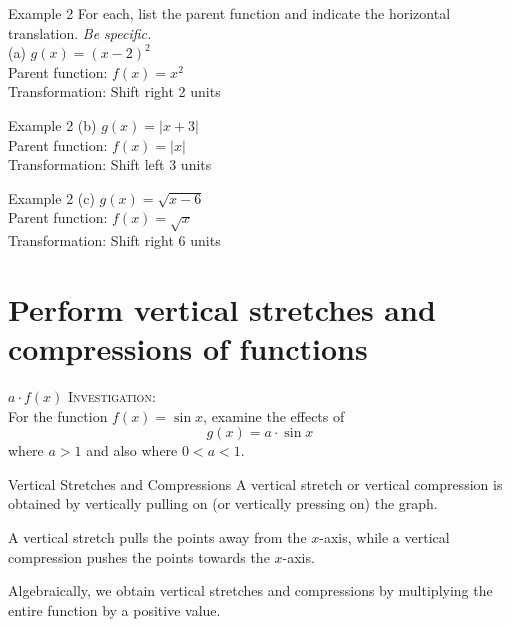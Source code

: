 \documentclass[t]{beamer}
\begin{document}
\begin{frame}{Example 2}
For each, list the parent function and indicate the horizontal translation. \emph{Be specific.}	\newline\\
(a) \quad $g(x) = (x-2)^2$	\newline\\	\pause
Parent function: $f(x) = x^2$ \newline\\	\pause
Transformation: Shift right 2 units
\end{frame}

\begin{frame}{Example 2}
(b) \quad $g(x) = |x+3|$	\newline\\	\pause
Parent function: $f(x) = |x|$ \newline\\	\pause
Transformation: Shift left 3 units
\end{frame}

\begin{frame}{Example 2}
(c) \quad $g(x) = \sqrt{x-6}$	\newline\\	\pause
Parent function: $f(x) = \sqrt{x}$ \newline\\	\pause
Transformation: Shift right 6 units
\end{frame}

\section{Perform vertical stretches and compressions of functions}

\begin{frame}{$a \cdot f(x)$}
\textsc{Investigation:}	\newline\\

For the function $f(x) = \sin x$, examine the effects of
\[g(x) = a \cdot \sin x \]
where $a > 1$ and also where $0 < a < 1$.
\end{frame}

\begin{frame}{Vertical Stretches and Compressions}
A \alert{vertical stretch} or \alert{vertical compression} is obtained by vertically pulling on (or vertically pressing on) the graph.	\newline\\	\pause

A vertical stretch pulls the points away from the $x$-axis, while a vertical compression pushes the points towards the $x$-axis. \newline\\ \pause

Algebraically, we obtain vertical stretches and compressions by multiplying the entire function by a positive value.
\end{frame}
\end{document}
